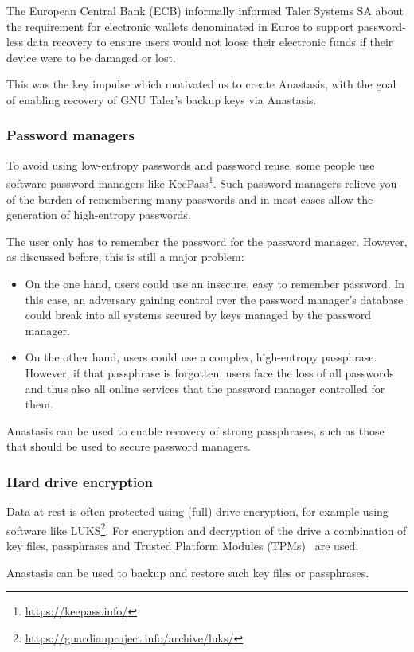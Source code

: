 The European Central Bank (ECB) informally informed Taler Systems SA
about the requirement for electronic wallets denominated in Euros to
support password-less data recovery to ensure users would not loose
their electronic funds if their device were to be damaged or lost.

This was the key impulse which motivated us to create Anastasis,
with the goal of enabling recovery of GNU Taler's backup keys via
Anastasis.


\subsubsection{Password managers}

To avoid using low-entropy passwords and password reuse, some people
use software password managers like
KeePass\footnote{\url{https://keepass.info/}}. Such password managers
relieve you of the burden of remembering many passwords and in most
cases allow the generation of high-entropy passwords.

The user only has to remember the password for the password
manager. However, as discussed before, this is still a major problem:
\begin{itemize}
  \item On the one hand, users could use an insecure, easy to
remember password. In this case, an adversary gaining control
over the password manager's database could break into all systems
secured by keys managed by the password manager.
\item On the other hand, users could use a complex, high-entropy
  passphrase.  However, if that passphrase is forgotten, users
  face the loss of all passwords and thus also all online
  services that the password manager controlled for them.
\end{itemize}

Anastasis can be used to enable recovery of strong passphrases,
such as those that should be used to secure password managers.


\subsubsection{Hard drive encryption}

Data at rest is often protected using (full) drive encryption, for
example using software like
LUKS\footnote{\url{https://guardianproject.info/archive/luks/}}.  For
encryption and decryption of the drive a combination of key files,
passphrases and Trusted Platform Modules (TPMs)~\cite{bajikar2002} are
used.

Anastasis can be used to backup and restore such key files or
passphrases.
